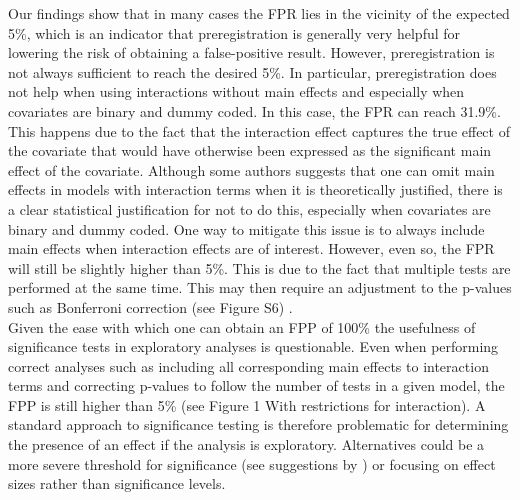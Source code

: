 
Our findings show that in many cases the FPR lies in the vicinity of the expected 5\%, which is an indicator that preregistration is generally very helpful for lowering the risk of obtaining a false-positive result. However, preregistration is not always sufficient to reach the desired 5\%. In particular, preregistration does not help when using interactions without main effects and especially when covariates are binary and dummy coded. In this case, the FPR can reach 31.9\%. This happens due to the fact that the interaction effect captures the true effect of the covariate that would have otherwise been expressed as the significant main effect of the covariate. Although some authors suggests that one can omit main effects in models with interaction terms when it is theoretically justified, there is a clear statistical justification for not to do this, especially when covariates are binary and dummy coded. One way to mitigate this issue is to always include main effects when interaction effects are of interest. However, even so, the FPR will still be slightly higher than 5\%. This is due to the fact that multiple tests are performed at the same time. This may then require an adjustment to the p-values such as Bonferroni correction (see Figure S6) \citep{dunn1961multiple}. \\

Given the ease with which one can obtain an FPP of 100\% the usefulness of significance tests in exploratory analyses is questionable. Even when performing correct analyses such as including all corresponding main effects to interaction terms and correcting p-values to follow the number of tests in a given model, the FPP is still higher than 5\% (see Figure 1 With restrictions for interaction). A standard approach to significance testing is therefore problematic for determining the presence of an effect if the analysis is exploratory. Alternatives could be a more severe threshold for significance (see suggestions by \cite{benjamin2018}) or focusing on effect sizes rather than significance levels. \\
    
